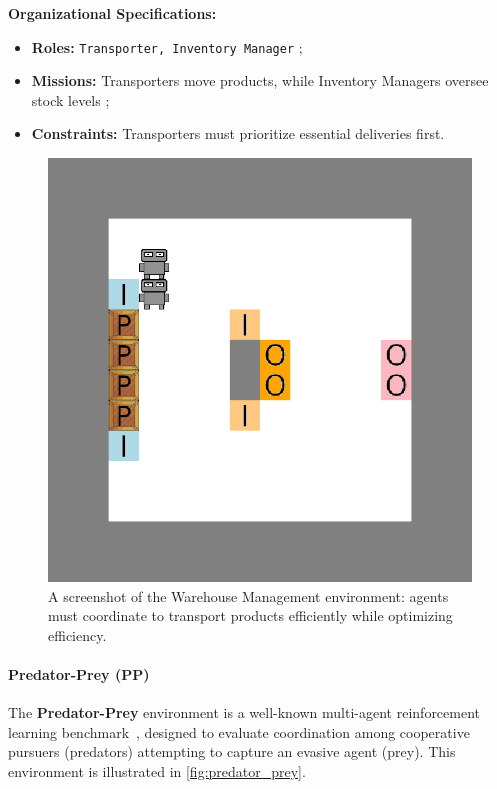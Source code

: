 \documentclass[pdflatex,sn-mathphys-num]{sn-jnl}%
\theoremstyle{thmstyleone}%
\theoremstyle{thmstyletwo}%
\theoremstyle{thmstylethree}%
\begin{document}
\textbf{Organizational Specifications:}
\begin{itemize}
    \item \textbf{Roles:} \texttt{Transporter, Inventory Manager} ;
    \item \textbf{Missions:} Transporters move products, while Inventory Managers oversee stock levels ;
    \item \textbf{Constraints:} Transporters must prioritize essential deliveries first.
\end{itemize}

\begin{figure}[h!]
    \centering
    \includegraphics[width=0.7\linewidth]{figures/wm.png}
    \caption{A screenshot of the Warehouse Management environment: agents must coordinate to transport products efficiently while optimizing efficiency.}
    \label{fig:warehouse}
\end{figure}

\paragraph{Predator-Prey (PP)}
The \textbf{Predator-Prey} environment is a well-known multi-agent reinforcement learning benchmark~\cite{lowe2017multi}, designed to evaluate coordination among cooperative pursuers (predators) attempting to capture an evasive agent (prey). This environment is illustrated in \autoref{fig:predator_prey}.
\end{document}
